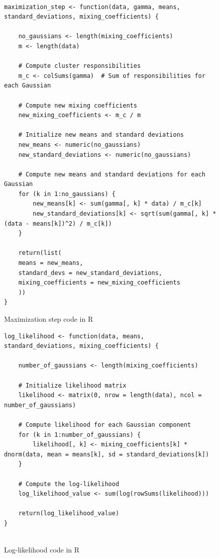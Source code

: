 \documentclass[]{article}
\begin{document}
\begin{figure}[H]
	\captionsetup{type=lstlisting}
	\begin{lstlisting}

maximization_step <- function(data, gamma, means, standard_deviations, mixing_coefficients) {
	
	no_gaussians <- length(mixing_coefficients)
	m <- length(data)
	
	# Compute cluster responsibilities
	m_c <- colSums(gamma)  # Sum of responsibilities for each Gaussian
	
	# Compute new mixing coefficients
	new_mixing_coefficients <- m_c / m
	
	# Initialize new means and standard deviations
	new_means <- numeric(no_gaussians)
	new_standard_deviations <- numeric(no_gaussians)
	
	# Compute new means and standard deviations for each Gaussian
	for (k in 1:no_gaussians) {
		new_means[k] <- sum(gamma[, k] * data) / m_c[k]
		new_standard_deviations[k] <- sqrt(sum(gamma[, k] * (data - means[k])^2) / m_c[k])
	}
	
	return(list(
	means = new_means,
	standard_devs = new_standard_deviations,
	mixing_coefficients = new_mixing_coefficients
	))
}

	\end{lstlisting}
	\caption{Maximization step code in R}
	\label{lst:em-max}
\end{figure}

\begin{figure}[H]
	\captionsetup{type=lstlisting}
	\begin{lstlisting}
log_likelihood <- function(data, means, standard_deviations, mixing_coefficients) {
	
	number_of_gaussians <- length(mixing_coefficients)
	
	# Initialize likelihood matrix
	likelihood <- matrix(0, nrow = length(data), ncol = number_of_gaussians)
	
	# Compute likelihood for each Gaussian component
	for (k in 1:number_of_gaussians) {
		likelihood[, k] <- mixing_coefficients[k] * dnorm(data, mean = means[k], sd = standard_deviations[k])
	}
	
	# Compute the log-likelihood
	log_likelihood_value <- sum(log(rowSums(likelihood)))
	
	return(log_likelihood_value)
}
			
		\end{lstlisting}
	\caption{Log-likelihood code in R}
	\label{lst:em-ll}
\end{figure}
\end{document}

